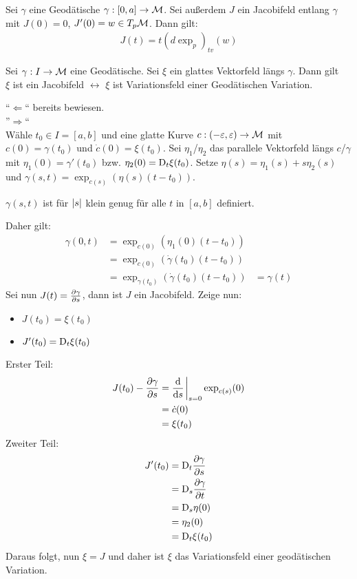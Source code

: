 \begin{lem}
    Sei $\gamma$ eine Geodätische $\gamma : [0,a]\to\mathcal{M}$.
    Sei außerdem $J$ ein Jacobifeld entlang $\gamma$ mit 
    $J(0)=0$, $J'(0)=w \in T_p\mathcal{M}$.
    Dann gilt:
    \begin{align*}
        J(t) = t (d \exp_p)_{tv} (w)
    \end{align*}
\end{lem}

\begin{satz}
    Sei $\gamma : I \to \mathcal{M}$ eine Geodätische.
    Sei $\xi$ ein glattes Vektorfeld längs $\gamma$.
    Dann gilt\\
    $\xi$ ist ein Jacobifeld $\leftrightarrow$ $\xi$ ist Variationsfeld einer Geodätischen Variation.
\end{satz}


\begin{bew}
``$\Leftarrow$`` bereits bewiesen.\\
''$\Rightarrow$``\\
Wähle $t_0\in I = [a, b]$ und eine glatte Kurve $c : (-\varepsilon, \varepsilon) \to \mathcal{M}$
mit $c(0) = \gamma(t_0)$ und $\dot{c}(0)=\xi (t_0)$.
Sei $\eta_1$/$\eta_2$  das parallele Vektorfeld längs $c$/$\gamma$ mit $\eta_1 (0) = \gamma' (t_0)$
bzw. $\eta_2(0)=\mathrm{D}_t \xi (t_0)$.
Setze $\eta (s) = \eta_1 (s) + s \eta_2 (s)$ und
$\gamma (s,t) = \exp_{c(s)} (\eta (s) (t-t_0))$.
\begin{bem}
    $\gamma (s,t)$ ist für $\abs{s}$ klein genug für alle $t$ in $[a, b]$ definiert.
\end{bem}
Daher gilt:
\begin{align*}
\gamma (0,t) &= \exp_{c(0)} (\eta_1(0) (t-t_0))\\
&=\exp_{c(0)} (\dot{\gamma}(t_0) (t-t_0))\\
&=\exp_{\gamma(t_0)} (\dot{\gamma}(t_0) (t-t_0)) 
&= \gamma(t)
\end{align*}
Sei nun $J(t) = \pdv{\gamma}{s}(0,t)$, dann ist $J$ ein Jacobifeld.
Zeige nun:
\begin{itemize}
    \item $J(t_0) = \xi (t_0)$
    \item $J'(t_0) = \mathrm{D}_t \xi (t_0)$
\end{itemize}
Erster Teil:
\begin{align*}
    J(t_0 ) - \pdv{\gamma}{s}(0,t_0) &= \dv{s}\eval_{s=0} \exp_{c(s)} (0)\\
    &= \dot{c}(0)\\
    &= \xi (t_0)
\end{align*}
Zweiter Teil:
\begin{align*}
J'(t_0) &= \mathrm{D}_t \pdv{\gamma}{s}(0,t_0)\\
&= \mathrm{D}_s \pdv{\gamma}{t}(0,t_0)\\
&= \mathrm{D}_s \eta(0)\\
&= \eta_2(0)\\
&= \mathrm{D}_t \xi (t_0)
\end{align*}
Daraus folgt, nun $\xi = J$ und daher ist $\xi$ das Variationsfeld einer geodätischen Variation.
\end{bew}

